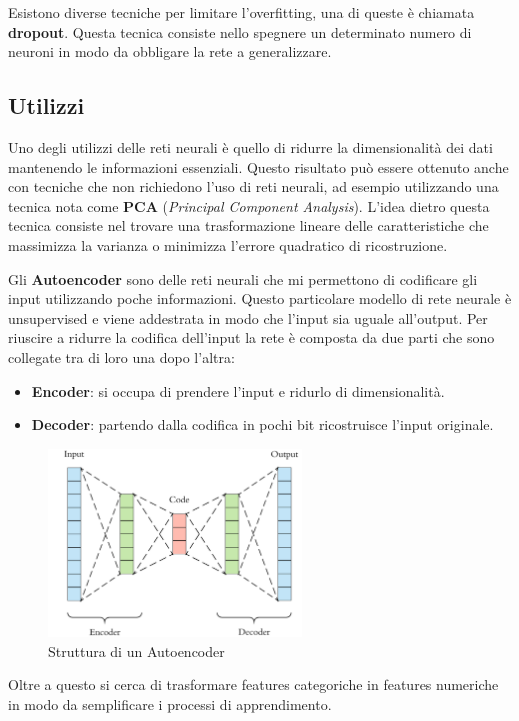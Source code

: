Esistono diverse tecniche per limitare l'overfitting, una di queste è chiamata
\textbf{dropout}. Questa tecnica consiste nello spegnere un determinato numero di
neuroni in modo da obbligare la rete a generalizzare.
\subsection{Utilizzi}
Uno degli utilizzi delle reti neurali è quello di ridurre la dimensionalità dei
dati mantenendo le informazioni essenziali. Questo risultato può essere ottenuto
anche con tecniche che non richiedono l'uso di reti neurali, ad esempio utilizzando
una tecnica nota come \textbf{PCA} (\textit{Principal Component Analysis}). L'idea
dietro questa tecnica consiste nel trovare una trasformazione lineare delle
caratteristiche che massimizza la varianza o minimizza l'errore quadratico di
ricostruzione.

Gli \textbf{Autoencoder} sono delle reti neurali che mi permettono di codificare
gli input utilizzando poche informazioni. Questo particolare modello di rete neurale
è unsupervised e viene addestrata in modo che l'input sia uguale all'output. Per
riuscire a ridurre la codifica dell'input la rete è composta da due parti che sono
collegate tra di loro una dopo l'altra:
\begin{itemize}
    \item \textbf{Encoder}: si occupa di prendere l'input e ridurlo di dimensionalità.
    \item \textbf{Decoder}: partendo dalla codifica in pochi bit ricostruisce l'input originale.
\end{itemize}
\begin{figure}[!ht]
    \centering
    \includegraphics[width = 0.6\textwidth]{img/reti/autoencoder.png}
    \caption{Struttura di un Autoencoder}
\end{figure}

Oltre a questo si cerca di trasformare features categoriche in features numeriche
in modo da semplificare i processi di apprendimento.
